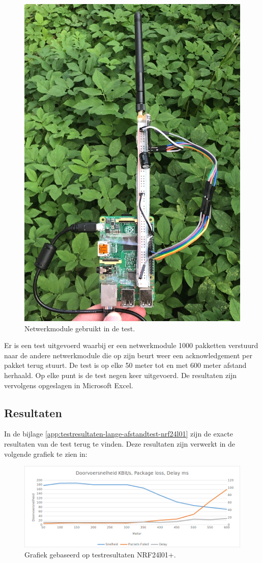 \documentclass[a4paper, 11pt, oneside]{report}
\begin{document}
\begin{figure}[H]
	\begin{center}\includegraphics[width=.5\linewidth]{Afbeeldingen/testmodule.jpeg}\end{center}
	\caption{Netwerkmodule gebruikt in de test.}
	\label{fig:testmodule}
\end{figure}

Er is een test uitgevoerd waarbij er een netwerkmodule 1000 pakketten verstuurd naar de andere netwerkmodule die op zijn beurt weer een acknowledgement per pakket terug stuurt. De test is op elke 50 meter tot en met 600 meter afstand herhaald. Op elke punt is de test negen keer uitgevoerd. De resultaten zijn vervolgens opgeslagen in Microsoft Excel. 

\subsection{Resultaten}

In de bijlage \ref{app:testresultaten-lange-afstandtest-nrf24l01} zijn de exacte resultaten van de test terug te vinden.
Deze resultaten zijn verwerkt in de volgende grafiek te zien in:

\begin{figure}[H]
	\begin{center}\includegraphics[width=1\linewidth]{Afbeeldingen/meetresultaten.png}\end{center}
	\caption{Grafiek gebaseerd op testresultaten NRF24l01+.}
	\label{fig:grafiektestresultaten }
\end{figure}
\end{document}
